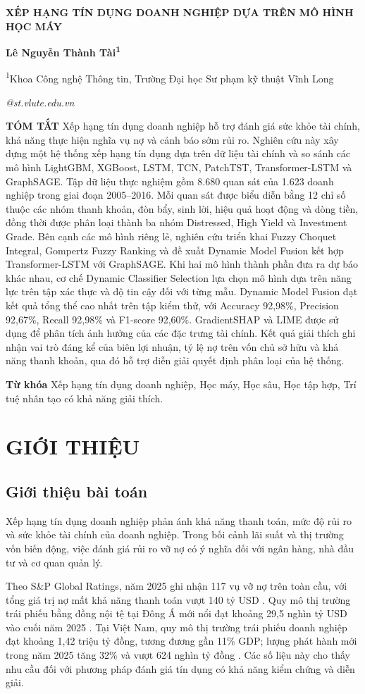 \documentclass[10pt,twoside]{article}
\makeatletter
\newcommand{\arialfont}{\fontfamily{phv}\selectfont}
\newcommand{\PaperTitle}{XẾP HẠNG TÍN DỤNG DOANH NGHIỆP DỰA TRÊN MÔ HÌNH HỌC MÁY}
\newcommand{\PaperAuthors}{Lê Nguyễn Thành Tài\textsuperscript{1}}
\newcommand{\PaperAffiliations}{%
\textsuperscript{1}Khoa Công nghệ Thông tin, Trường Đại học Sư phạm kỹ thuật Vĩnh Long
}
\newcommand{\PaperEmail}{22022001@st.vlute.edu.vn}
\newcommand{\makefairtitle}{%
\thispagestyle{firstpage}%
\begin{center}
{\arialfont\bfseries\fontsize{14pt}{16pt}\selectfont\MakeUppercase{\PaperTitle}\par}
\vspace{3pt}
{\bfseries\normalsize\PaperAuthors\par}
\vspace{3pt}
{\fontsize{9pt}{11pt}\selectfont\PaperAffiliations\par}
\vspace{3pt}
{\itshape\fontsize{9pt}{11pt}\selectfont\PaperEmail\par}
\end{center}
\vspace{6pt}%
}
\newcommand{\FairDash}{\unskip\textemdash\space}
\newenvironment{fairabstract}{%
\begingroup
\fontsize{9pt}{11pt}\selectfont
\itshape
\setlength{\parindent}{1cm}%
\setlength{\parskip}{6pt}%
}{%
\par\endgroup
}
\newcommand{\fairabstracttext}[1]{%
\begin{fairabstract}
\textbf{TÓM TẮT}\FairDash #1
\end{fairabstract}
}
\newcommand{\fairkeywords}[1]{%
\begin{fairabstract}
\textbf{Từ khóa}\FairDash #1
\end{fairabstract}
}
\makeatother
\begin{document}
\makefairtitle

\fairabstracttext{%
Xếp hạng tín dụng doanh nghiệp hỗ trợ đánh giá sức khỏe tài chính, khả năng thực hiện nghĩa vụ nợ và cảnh báo sớm rủi ro. Nghiên cứu này xây dựng một hệ thống xếp hạng tín dụng dựa trên dữ liệu tài chính và so sánh các mô hình LightGBM, XGBoost, LSTM, TCN, PatchTST, Transformer-LSTM và GraphSAGE. Tập dữ liệu thực nghiệm gồm 8.680 quan sát của 1.623 doanh nghiệp trong giai đoạn 2005--2016. Mỗi quan sát được biểu diễn bằng 12 chỉ số thuộc các nhóm thanh khoản, đòn bẩy, sinh lời, hiệu quả hoạt động và dòng tiền, đồng thời được phân loại thành ba nhóm Distressed, High Yield và Investment Grade. Bên cạnh các mô hình riêng lẻ, nghiên cứu triển khai Fuzzy Choquet Integral, Gompertz Fuzzy Ranking và đề xuất Dynamic Model Fusion kết hợp Transformer-LSTM với GraphSAGE. Khi hai mô hình thành phần đưa ra dự báo khác nhau, cơ chế Dynamic Classifier Selection lựa chọn mô hình dựa trên năng lực trên tập xác thực và độ tin cậy đối với từng mẫu. Dynamic Model Fusion đạt kết quả tổng thể cao nhất trên tập kiểm thử, với Accuracy 92,98\%, Precision 92,67\%, Recall 92,98\% và F1-score 92,60\%. GradientSHAP và LIME được sử dụng để phân tích ảnh hưởng của các đặc trưng tài chính. Kết quả giải thích ghi nhận vai trò đáng kể của biên lợi nhuận, tỷ lệ nợ trên vốn chủ sở hữu và khả năng thanh khoản, qua đó hỗ trợ diễn giải quyết định phân loại của hệ thống.
}

\fairkeywords{%
Xếp hạng tín dụng doanh nghiệp, Học máy, Học sâu, Học tập hợp, Trí tuệ nhân tạo có khả năng giải thích.
}

\section{GIỚI THIỆU}
\subsection{Giới thiệu bài toán}
Xếp hạng tín dụng doanh nghiệp phản ánh khả năng thanh toán, mức độ rủi ro và sức khỏe tài chính của doanh nghiệp. Trong bối cảnh lãi suất và thị trường vốn biến động, việc đánh giá rủi ro vỡ nợ có ý nghĩa đối với ngân hàng, nhà đầu tư và cơ quan quản lý.

Theo S\&P Global Ratings, năm 2025 ghi nhận 117 vụ vỡ nợ trên toàn cầu, với tổng giá trị nợ mất khả năng thanh toán vượt 140 tỷ USD \cite{noauthor_default_nodate}. Quy mô thị trường trái phiếu bằng đồng nội tệ tại Đông Á mới nổi đạt khoảng 29,5 nghìn tỷ USD vào cuối năm 2025 \cite{bank_asia_2025}. Tại Việt Nam, quy mô thị trường trái phiếu doanh nghiệp đạt khoảng 1,42 triệu tỷ đồng, tương đương gần 11\% GDP; lượng phát hành mới trong năm 2025 tăng 32\% và vượt 624 nghìn tỷ đồng \cite{noauthor_tong_nodate}. Các số liệu này cho thấy nhu cầu đối với phương pháp đánh giá tín dụng có khả năng kiểm chứng và diễn giải.
\end{document}
